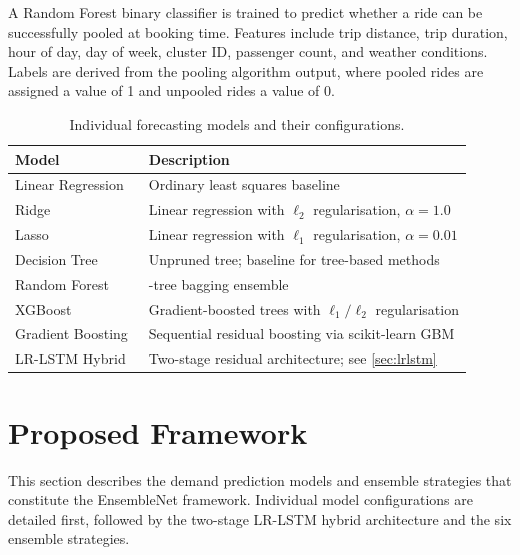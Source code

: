 \documentclass[a4paper,fleqn]{cas-dc}
\begin{document}
A Random Forest binary classifier is trained to predict whether a ride can be successfully pooled at booking time.  Features include trip distance, trip duration, hour of day, day of week, cluster ID, passenger count, and weather conditions.  Labels are derived from the pooling algorithm output, where pooled rides are assigned a value of 1 and unpooled rides a value of 0.

\begin{table}[t]
\centering
\caption{Individual forecasting models and their configurations.\label{tab:individual_models}}
\begin{tabularx}{\columnwidth}{>{\raggedright\arraybackslash}p{2.2cm} >{\raggedright\arraybackslash}X}
\toprule
\textbf{Model} & \textbf{Description} \\
\midrule
Linear Regression & Ordinary least squares baseline \\
Ridge~\cite{hoerl1970ridge} & Linear regression with $\ell_2$ regularisation, $\alpha=1.0$ \\
Lasso~\cite{tibshirani1996lasso} & Linear regression with $\ell_1$ regularisation, $\alpha=0.01$ \\
Decision Tree & Unpruned tree; baseline for tree-based methods \\
Random Forest~\cite{breiman2001rf} & 200-tree bagging ensemble \\
XGBoost~\cite{chen2016xgboost} & Gradient-boosted trees with $\ell_1/\ell_2$ regularisation \\
Gradient Boosting~\cite{friedman2001gbm} & Sequential residual boosting via scikit-learn GBM \\
LR-LSTM Hybrid~\cite{hochreiter1997long} & Two-stage residual architecture; see \autoref{sec:lrlstm} \\
\bottomrule
\end{tabularx}
\end{table}

\FloatBarrier

\section{Proposed Framework}
\label{sec:models}

This section describes the demand prediction models and ensemble strategies that constitute the EnsembleNet framework.  Individual model configurations are detailed first, followed by the two-stage LR-LSTM hybrid architecture and the six ensemble strategies.
\end{document}
